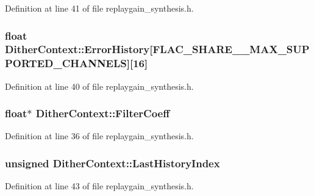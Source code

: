 Definition at line 41 of file replaygain\+\_\+synthesis.\+h.

\subsubsection[{\texorpdfstring{Error\+History}{ErrorHistory}}]{\setlength{\rightskip}{0pt plus 5cm}float Dither\+Context\+::\+Error\+History\mbox{[}{\bf F\+L\+A\+C\+\_\+\+S\+H\+A\+R\+E\+\_\+\+\_\+\+M\+A\+X\+\_\+\+S\+U\+P\+P\+O\+R\+T\+E\+D\+\_\+\+C\+H\+A\+N\+N\+E\+LS}\mbox{]}\mbox{[}16\mbox{]}}\hypertarget{struct_dither_context_a49ff3c226e326db2b683654f71a611b2}{}\label{struct_dither_context_a49ff3c226e326db2b683654f71a611b2}


Definition at line 40 of file replaygain\+\_\+synthesis.\+h.

\subsubsection[{\texorpdfstring{Filter\+Coeff}{FilterCoeff}}]{ float$\ast$ Dither\+Context\+::\+Filter\+Coeff}\hypertarget{struct_dither_context_ab3784bc63bc8949efb2731de73a5b347}{}\label{struct_dither_context_ab3784bc63bc8949efb2731de73a5b347}


Definition at line 36 of file replaygain\+\_\+synthesis.\+h.

\subsubsection[{\texorpdfstring{Last\+History\+Index}{LastHistoryIndex}}]{\setlength{\rightskip}{0pt plus 5cm}unsigned Dither\+Context\+::\+Last\+History\+Index}\hypertarget{struct_dither_context_ab1e929de991885e8740b28fa16bf5dca}{}\label{struct_dither_context_ab1e929de991885e8740b28fa16bf5dca}


Definition at line 43 of file replaygain\+\_\+synthesis.\+h.

